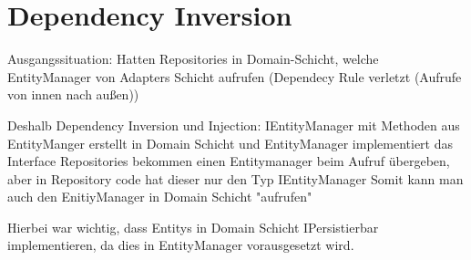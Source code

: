 \section{Dependency Inversion}

Ausgangssituation: Hatten Repositories in Domain-Schicht, welche EntityManager von Adapters Schicht aufrufen (Dependecy Rule verletzt (Aufrufe von innen nach außen))

Deshalb Dependency Inversion und Injection: 
IEntityManager mit Methoden aus EntityManger erstellt in Domain Schicht und EntityManager implementiert das Interface
Repositories bekommen einen Entitymanager beim Aufruf übergeben, aber in Repository code hat dieser nur den Typ IEntityManager
Somit kann man auch den EnitiyManager in Domain Schicht "aufrufen"

Hierbei war wichtig, dass Entitys in Domain Schicht IPersistierbar implementieren, da dies in EntityManager vorausgesetzt wird. 
